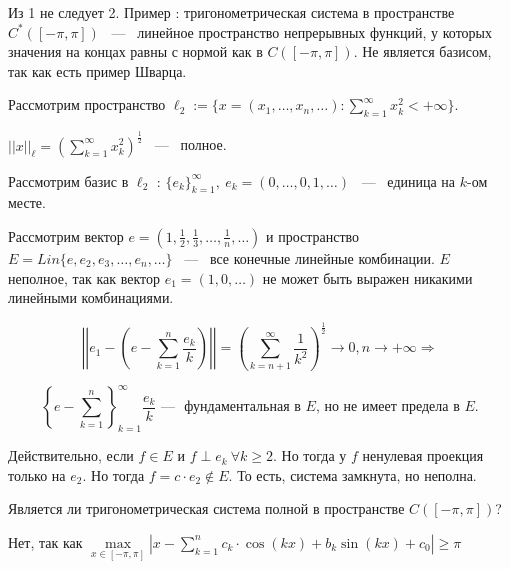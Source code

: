 \begin{answer}
    Из 1 не следует 2. Пример :  тригонометрическая система в пространстве $C^*([-\pi, \pi])$ ~---~ линейное пространство непрерывных функций, у которых значения на концах равны с нормой как в $C([-\pi, \pi])$. Не является базисом, так как есть пример Шварца.
\end{answer}

\begin{example}

\noindent Рассмотрим пространство  $\ell_2 := \{x = (x_1, \dots, x_n, \dots) : \sum\limits_{k = 1}^{\infty} x_k^2 < +
\infty\}$.

\noindent $||x||_{\ell} = \left(\sum\limits_{k = 1}^{\infty} x_k^2\right)^{\frac{1}{2}}$ ~---~ полное.

\noindent Рассмотрим базис в $\ell_2$ : $\{e_k\}_{k = 1}^{\infty}, \ e_k = (0, \dots, 0, 1, \dots)$ ~---~ единица на $k$-ом месте.

\noindent Рассмотрим вектор $e = (1, \frac{1}{2}, \frac{1}{3}, \dots, \frac{1}{n}, \dots)$ и пространство $E = Lin\{e, e_2, e_3, \dots, e_n, \dots \}$ ~---~ все конечные линейные комбинации. $E$ неполное, так как вектор $e_1 = (1, 0, \dots)$ не может быть выражен никакими линейными комбинациями.

$$
\left|\left| e_1 - (e - \sum\limits_{k = 1}^{n} \dfrac{e_k}{k}) \right|\right| = \left(\sum\limits_{k = n + 1}^{\infty} \dfrac{1}{k^2} \right)^{\frac{1}{2}} \rightarrow 0, n \rightarrow +\infty \Rightarrow
$$

$$
\left \{ e - \sum\limits_{k = 1}^{n}\right\}_{k = 1}^{\infty} \dfrac{e_k}{k}\text{~---~ фундаментальная в } E \text{, но не имеет предела в } E.
$$

\noindent Действительно, если $f \in E$  и $f \perp e_k \ \forall k \ge 2$. Но тогда у $f$ ненулевая проекция только на $e_2$. Но тогда $f = c \cdot e_2 \notin E$. То есть, система замкнута, но неполна.
\end{example}

\begin{problem}
    Является ли тригонометрическая система полной в пространстве $C([-\pi, \pi])$?
\end{problem}

\begin{answer}
    Нет, так как $\max\limits_{x \in [-\pi, \pi]} \left|x - \sum\limits_{k = 1}^{n} c_k \cdot \cos(kx) + b_k \sin (kx) + c_0 \right| \ge \pi$
\end{answer}

